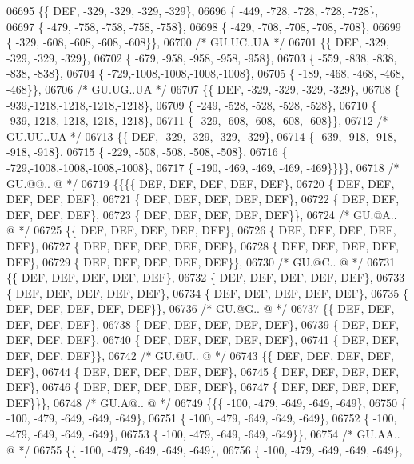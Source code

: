 \begin{DoxyCode}
06695 \{\{  DEF, -329, -329, -329, -329\},
06696 \{ -449, -728, -728, -728, -728\},
06697 \{ -479, -758, -758, -758, -758\},
06698 \{ -429, -708, -708, -708, -708\},
06699 \{ -329, -608, -608, -608, -608\}\},
06700 \textcolor{comment}{/* GU.UC..UA */}
06701 \{\{  DEF, -329, -329, -329, -329\},
06702 \{ -679, -958, -958, -958, -958\},
06703 \{ -559, -838, -838, -838, -838\},
06704 \{ -729,-1008,-1008,-1008,-1008\},
06705 \{ -189, -468, -468, -468, -468\}\},
06706 \textcolor{comment}{/* GU.UG..UA */}
06707 \{\{  DEF, -329, -329, -329, -329\},
06708 \{ -939,-1218,-1218,-1218,-1218\},
06709 \{ -249, -528, -528, -528, -528\},
06710 \{ -939,-1218,-1218,-1218,-1218\},
06711 \{ -329, -608, -608, -608, -608\}\},
06712 \textcolor{comment}{/* GU.UU..UA */}
06713 \{\{  DEF, -329, -329, -329, -329\},
06714 \{ -639, -918, -918, -918, -918\},
06715 \{ -229, -508, -508, -508, -508\},
06716 \{ -729,-1008,-1008,-1008,-1008\},
06717 \{ -190, -469, -469, -469, -469\}\}\}\},
06718 \textcolor{comment}{/* GU.@@.. @ */}
06719 \{\{\{\{  DEF,  DEF,  DEF,  DEF,  DEF\},
06720 \{  DEF,  DEF,  DEF,  DEF,  DEF\},
06721 \{  DEF,  DEF,  DEF,  DEF,  DEF\},
06722 \{  DEF,  DEF,  DEF,  DEF,  DEF\},
06723 \{  DEF,  DEF,  DEF,  DEF,  DEF\}\},
06724 \textcolor{comment}{/* GU.@A.. @ */}
06725 \{\{  DEF,  DEF,  DEF,  DEF,  DEF\},
06726 \{  DEF,  DEF,  DEF,  DEF,  DEF\},
06727 \{  DEF,  DEF,  DEF,  DEF,  DEF\},
06728 \{  DEF,  DEF,  DEF,  DEF,  DEF\},
06729 \{  DEF,  DEF,  DEF,  DEF,  DEF\}\},
06730 \textcolor{comment}{/* GU.@C.. @ */}
06731 \{\{  DEF,  DEF,  DEF,  DEF,  DEF\},
06732 \{  DEF,  DEF,  DEF,  DEF,  DEF\},
06733 \{  DEF,  DEF,  DEF,  DEF,  DEF\},
06734 \{  DEF,  DEF,  DEF,  DEF,  DEF\},
06735 \{  DEF,  DEF,  DEF,  DEF,  DEF\}\},
06736 \textcolor{comment}{/* GU.@G.. @ */}
06737 \{\{  DEF,  DEF,  DEF,  DEF,  DEF\},
06738 \{  DEF,  DEF,  DEF,  DEF,  DEF\},
06739 \{  DEF,  DEF,  DEF,  DEF,  DEF\},
06740 \{  DEF,  DEF,  DEF,  DEF,  DEF\},
06741 \{  DEF,  DEF,  DEF,  DEF,  DEF\}\},
06742 \textcolor{comment}{/* GU.@U.. @ */}
06743 \{\{  DEF,  DEF,  DEF,  DEF,  DEF\},
06744 \{  DEF,  DEF,  DEF,  DEF,  DEF\},
06745 \{  DEF,  DEF,  DEF,  DEF,  DEF\},
06746 \{  DEF,  DEF,  DEF,  DEF,  DEF\},
06747 \{  DEF,  DEF,  DEF,  DEF,  DEF\}\}\},
06748 \textcolor{comment}{/* GU.A@.. @ */}
06749 \{\{\{ -100, -479, -649, -649, -649\},
06750 \{ -100, -479, -649, -649, -649\},
06751 \{ -100, -479, -649, -649, -649\},
06752 \{ -100, -479, -649, -649, -649\},
06753 \{ -100, -479, -649, -649, -649\}\},
06754 \textcolor{comment}{/* GU.AA.. @ */}
06755 \{\{ -100, -479, -649, -649, -649\},
06756 \{ -100, -479, -649, -649, -649\},

\end{DoxyCode}
